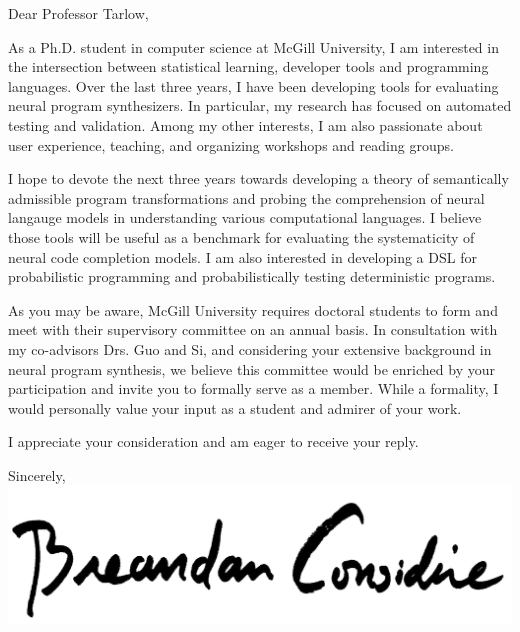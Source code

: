 \documentclass{letter}
\begin{document}
    \begin{letter}{}
        \opening{Dear Professor Tarlow,\\}
        As a Ph.D. student in computer science at McGill University, I am interested in the intersection between statistical learning, developer tools and programming languages. Over the last three years, I have been developing tools for evaluating neural program synthesizers. In particular, my research has focused on automated testing and validation. Among my other interests, I am also passionate about user experience, teaching, and organizing workshops and reading groups.

        I hope to devote the next three years towards developing a theory of semantically admissible program transformations and probing the comprehension of neural langauge models in understanding various computational languages. I believe those tools will be useful as a benchmark for evaluating the systematicity of neural code completion models. I am also interested in developing a DSL for probabilistic programming and probabilistically testing deterministic programs.

        As you may be aware, McGill University requires doctoral students to form and meet with their supervisory committee on an annual basis. In consultation with my co-advisors Drs. Guo and Si, and considering your extensive background in neural program synthesis, we believe this committee would be enriched by your participation and invite you to formally serve as a member. While a formality, I would personally value your input as a student and admirer of your work.

        I appreciate your consideration and am eager to receive your reply.\\

        \closing{Sincerely,\\
        \includegraphics[scale=0.06]{signature.png}\\
        }
    \end{letter}
\end{document}
